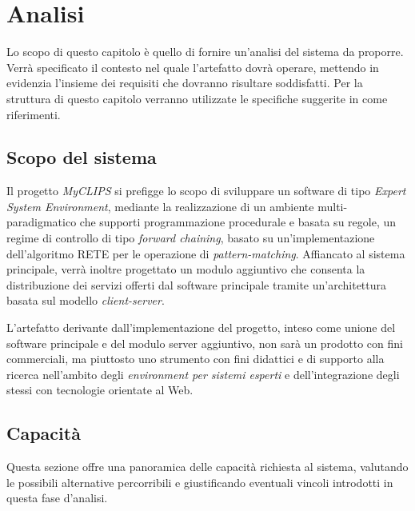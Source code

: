 
\chapter{Analisi}

Lo scopo di questo capitolo è quello di fornire un'analisi del sistema da proporre. Verrà specificato il contesto nel quale l'artefatto dovrà operare, mettendo in evidenzia l'insieme dei requisiti che dovranno risultare soddisfatti. Per la struttura di questo capitolo verranno utilizzate le specifiche suggerite in \cite{ieee830-1998} come riferimenti.

\section{Scopo del sistema}

Il progetto \emph{MyCLIPS} si prefigge lo scopo di sviluppare un software di tipo \emph{Expert System Environment}, mediante la realizzazione di un ambiente multi-paradigmatico che supporti programmazione procedurale e basata su regole, un regime di controllo di tipo \emph{forward chaining}, basato su un'implementazione dell'algoritmo RETE per le operazione di \emph{pattern-matching}.
Affiancato al sistema principale, verrà inoltre progettato un modulo aggiuntivo che consenta la distribuzione dei servizi offerti dal software principale tramite un'architettura basata sul modello \emph{client-server}.

L'artefatto derivante dall'implementazione del progetto, inteso come unione del software principale e del modulo server aggiuntivo, non sarà un prodotto con fini commerciali, ma piuttosto uno strumento con fini didattici e di supporto alla ricerca nell'ambito degli \emph{environment per sistemi esperti} e dell'integrazione degli stessi con tecnologie orientate al Web.


%


%

\section{Capacità}

Questa sezione offre una panoramica delle capacità richiesta al sistema, valutando le possibili alternative percorribili e giustificando eventuali vincoli introdotti in questa fase d'analisi.

